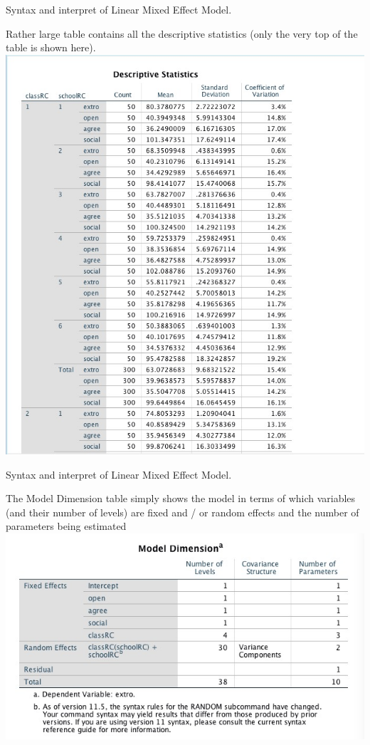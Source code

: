 \documentclass[ignorenonframetext,]{beamer}
\begin{document}
\begin{frame}{Syntax and interpret of Linear Mixed Effect Model.}

Rather large table contains all the descriptive statistics (only the
very top of the table is shown here).
\includegraphics{Descriptive data.jpeg}\\

\end{frame}

\begin{frame}{Syntax and interpret of Linear Mixed Effect Model.}

The Model Dimension table simply shows the model in terms of which
variables (and their number of levels) are fixed and / or random effects
and the number of parameters being estimated
\includegraphics{model dimension.jpeg}\\

\end{frame}
\end{document}
